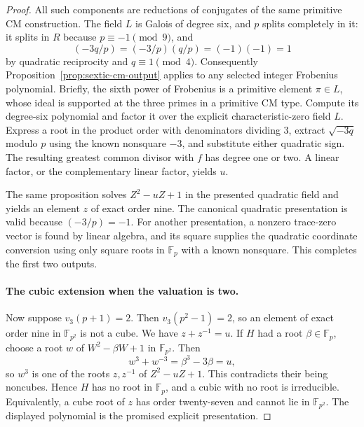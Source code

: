 \documentclass[11pt]{article}
\theoremstyle{definition}
\theoremstyle{remark}
\begin{document}
\begin{proof}
All such components are reductions of conjugates of the same
primitive CM construction. The field \(L\) is Galois of degree
six, and \(p\) splits completely in it: it splits in \(R\)
because \(p\equiv-1\pmod9\), and
\[
 (-3q/p)=(-3/p)(q/p)=(-1)(-1)=1
\]
by quadratic reciprocity and \(q\equiv1\pmod4\).
Consequently Proposition~\ref{prop:sextic-cm-output} applies to
any selected integer Frobenius polynomial. Briefly, the sixth
power of Frobenius is a primitive element \(\pi\in L\), whose
ideal is supported at the three primes in a primitive CM type.
Compute its degree-six polynomial and factor it over the
explicit characteristic-zero field \(L\). Express a root in
the product order with denominators dividing \(3\), extract
\(\sqrt{-3q}\) modulo \(p\) using the known nonsquare \(-3\),
and substitute either quadratic sign. The resulting greatest
common divisor with \(f\) has degree one or two. A linear
factor, or the complementary linear factor, yields \(u\).

The same proposition solves \(Z^2-uZ+1\) in the presented
quadratic field and yields an element \(z\) of exact order nine.
The canonical quadratic presentation is valid because
\(({-3}/p)=-1\). For another presentation, a nonzero trace-zero
vector is found by linear algebra, and its square supplies the
quadratic coordinate conversion using only square roots in
\(\mathbb F_p\) with a known nonsquare. This completes the
first two outputs.

\paragraph{The cubic extension when the valuation is two.}
Now suppose \(v_3(p+1)=2\). Then \(v_3(p^2-1)=2\), so an
element of exact order nine in \(\mathbb F_{p^2}\) is not a
cube. We have \(z+z^{-1}=u\). If \(H\) had a root
\(\beta\in\mathbb F_p\), choose a root \(w\) of
\(W^2-\beta W+1\) in \(\mathbb F_{p^2}\). Then
\[
 w^3+w^{-3}=\beta^3-3\beta=u,
\]
so \(w^3\) is one of the roots \(z,z^{-1}\) of
\(Z^2-uZ+1\). This contradicts their being noncubes.
Hence \(H\) has no root in \(\mathbb F_p\), and a cubic with
no root is irreducible. Equivalently, a cube root of \(z\) has
order twenty-seven and cannot lie in \(\mathbb F_{p^2}\).
The displayed polynomial is the promised explicit presentation.


\end{proof}
\end{document}
